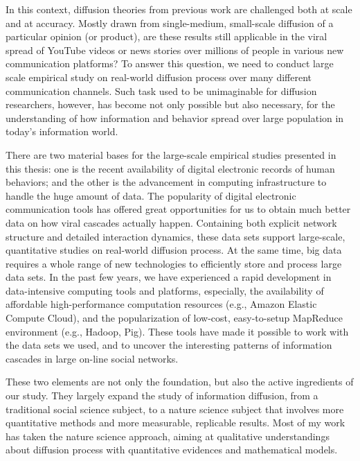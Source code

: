 \documentclass[phd,tocprelim]{cornell}
\begin{document}


In this context, diffusion theories from previous work are challenged both at scale and at accuracy. Mostly drawn from single-medium, small-scale diffusion of a particular opinion (or product), are these results still applicable in the  viral spread of YouTube videos or news stories over millions of people in various new communication platforms? To answer this question, we need to conduct large scale empirical study on real-world diffusion process over many different communication channels. Such task used to be unimaginable for diffusion researchers, however, has become not only possible but also necessary, for the understanding of how information and behavior spread over large population in today's information world. 

There are two material bases for the large-scale empirical studies presented in this thesis: one is the recent availability of digital electronic records of human behaviors; and the other is the advancement in computing infrastructure to handle the huge amount of data. The popularity of digital electronic communication tools has offered great opportunities for us to obtain much better data on how viral cascades actually happen. Containing both explicit network structure and detailed interaction dynamics, these data sets support large-scale, quantitative studies on real-world diffusion process. At the same time, big data requires a whole range of new technologies to efficiently store and process large data sets. In the past few years, we have experienced a rapid development in data-intensive computing tools and platforms, especially, the availability of affordable high-performance computation resources (e.g., Amazon Elastic Compute Cloud\cite{amazon-ec2}), and the popularization of low-cost, easy-to-setup MapReduce\cite{Dean:2004} environment (e.g., Hadoop\cite{hadoop}, Pig\cite{pig}). These tools have made it possible to work with the data sets we used, and to uncover the interesting patterns of information cascades in large on-line social networks.

These two elements are not only the foundation, but also the active ingredients of our study. They largely expand the study of information diffusion, from a 
traditional social science subject, to a nature science subject that involves  more quantitative methods and more measurable, replicable results. Most of my work has taken the nature science approach, aiming at qualitative understandings about diffusion process with quantitative evidences and mathematical models.
\end{document}
